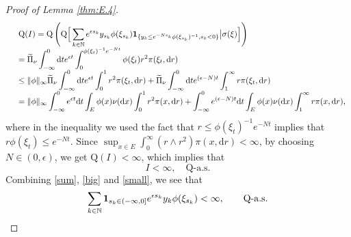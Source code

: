 \documentclass[12pt,a4paper]{amsart}
\numberwithin{equation}{section}
\theoremstyle{plain}
\theoremstyle{definition}
\theoremstyle{remark}
\begin{document}
\begin{proof}[Proof of Lemma \ref{thm:E.4}]
$$\begin{array}{rl}
&\mathrm Q(I)=\displaystyle \mathrm Q\left(\mathrm Q\Big[\sum_{k\in\mathbb N} e^{\epsilon s_k}y_{s_k}\phi(\xi_{s_k}) {\bf 1}_{\{y_k\le e^{-N s_k}\phi(\xi_{s_k})^{-1}, s_k<0\}}\big|\sigma(\xi)\Big]\right)\\
&=\displaystyle \widetilde{\Pi}_\nu\int_{-\infty}^0 \mathrm dt e^{\epsilon t}\int_0^{\phi({\xi}_t)^{-1} e^{-N t}}\phi(\xi_t)r^2 \pi(\xi_t, \mathrm dr)\\
&\le \displaystyle\|\phi\|_{\infty}\widetilde{\Pi}_\nu\int_{-\infty}^0 \mathrm dt e^{\epsilon t}\int_0^1r^2 \pi(\xi_t, \mathrm dr)
+\widetilde{\Pi}_\nu\int_{-\infty}^0 \mathrm dt e^{(\epsilon-N)t}\int_1^{\infty}r \pi(\xi_t, \mathrm dr)\\
&= \displaystyle\|\phi\|_{\infty}\int_{-\infty}^0  e^{\epsilon t}\mathrm dt\int_E\phi(x)\nu(\mathrm dx)\int_0^1r^2 \pi(x, \mathrm dr)
+\int_{-\infty}^0  e^{(\epsilon-N)t}\mathrm dt\int_E\phi(x)\nu(\mathrm dx)\int_1^{\infty}r \pi(x, \mathrm dr),
\end{array}
$$
where in  the inequality we used the fact that $r\le\phi(\xi_t)^{-1} e^{-N t}$ implies that $r\phi(\xi_t)\le e^{-N t}$.
Since $\sup_{x\in E}\int_0^\infty (r\wedge r^2) \pi(x, \mathrm dr)<\infty$, by choosing $N\in (0, \epsilon)$, we get
$\mathrm Q(I)<\infty$, which implies that
\begin{equation}\label{small}
I<\infty,\quad \mathrm Q\mbox{-a.s.}
\end{equation}
Combining \eqref{sum}, \eqref{big} and \eqref{small}, we see that
$$
\sum_{k\in \mathbb N}{\bf 1}_{s_k\in(-\infty,0]}e^{\epsilon s_k}y_k\phi(\xi_{s_k})<\infty,\qquad \mathrm Q\mbox{-a.s.}
$$



\end{proof}
\end{document}
